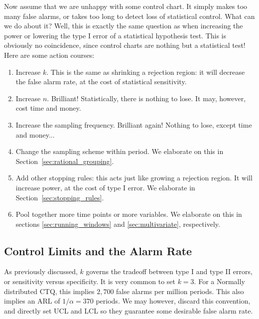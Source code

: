 Now assume that we are unhappy with some control chart. 
It simply makes too many false alarms, or takes too long to detect loss of statistical control.
What can we do about it?
Well, this is exactly the same question as when increasing the power or lowering the type I error of a statistical hypothesis test. This is obviously no coincidence, since control charts are nothing but a statistical test!
Here are some action courses:
\begin{enumerate}
\item Increase $k$. This is the same as shrinking a rejection region: 
it will decrease the false alarm rate, at the cost of statistical sensitivity.
\item Increase $n$. Brilliant! Statistically, there is nothing to lose. It may, however, cost time and money.
\item Increase the sampling frequency. Brilliant again! Nothing to lose, except time and money...
\item Change the sampling scheme within period. We elaborate on this in Section~\ref{sec:rational_grouping}.
\item Add other stopping rules: 
this acts just like growing a rejection region. It will increase power, at the cost of type I error. We elaborate in Section~\ref{sec:stopping_rules}.
\item Pool together more time points or more variables. We elaborate on this in sections \ref{sec:running_windows} and  \ref{sec:multivariate}, respectively. 
\end{enumerate}






\subsection{Control Limits and the Alarm Rate}
As previously discussed, $k$ governs the tradeoff between type I and type II errors, or sensitivity versus specificity.
It is very common to set $k=3$. 
For a Normally distributed CTQ, this implies $2,700$ false alarms per million periods. 
This also implies an ARL of $1/\alpha=370$ periods.
We may however, discard this convention, and directly set UCL and LCL so they guarantee some desirable false alarm rate. 

